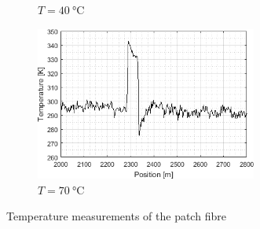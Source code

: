 \documentclass{standalone}
\begin{document}
\begin{landscape}
\begin{figure}[h]
\begin{subfigure}[b]{0.49\linewidth}
			\caption{$T = \SI{40}{\celsius}$}
		\end{subfigure}
		\begin{subfigure}[b]{0.49\linewidth}
			\centering
			\includegraphics[width=0.8\textwidth]{final_measurements_70c.png}
			\caption{$T = \SI{70}{\celsius}$}
		\end{subfigure}
		\caption{Temperature measurements of the patch fibre}
		\label{fig:final_measurements}
	\end{figure}
\end{landscape}


\setcounter{stranica}{\thepage}
\addtocounter{stranica}{1}
\end{document}
